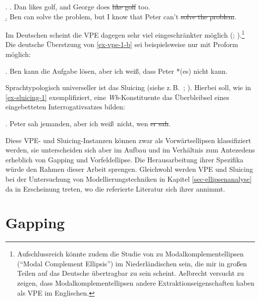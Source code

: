 \ex. \label{ex-vpe-1}
\a. Dan likes golf, and George does \sout{like golf} too. \\ \citep[(1)]{Dalrymple:etal:91}\label{ex-vpe-1-a}
\b. Ben can solve the problem, but I know that Peter can't \sout{solve the problem}. \hfill \citep[(32a), 134]{Winkler:05}\label{ex-vpe-1-b}

Im Deutschen scheint die VPE dagegen sehr viel eingeschränkter möglich (\citealt[158ff]{Lobeck:95}; \citealt[Kapitel~3]{Winkler:05}).\footnote{Aufschlussreich könnte zudem die Studie von \citet[Kapitel~2]{Aelbrecht:10} zu Modalkomplementellipsen ("`Modal Complement Ellipsis"') im Niederländischen sein, die mir in gro\ss en Teilen auf das Deutsche übertragbar zu sein scheint. Aelbrecht versucht zu zeigen, dass Modalkomplementellipsen andere Extraktionseigenschaften haben als VPE im Englischen.} Die deutsche Überstzung von \ref{ex-vpe-1-b} sei beispielsweise nur mit Proform möglich: 

\ex. Ben kann die Aufgabe lösen, aber ich weiß, dass Peter *(es) nicht kann. \hfill \citep[(33a), 134]{Winkler:05}\label{ex-vpe-2}

Sprachtypologisch universeller ist das Sluicing (siehe z.\,B.\  \citealt{Ross:69}; \citealt{Merchant:01}). Hierbei soll, wie in \ref{ex-sluicing-1} exemplifiziert, eine \textit{Wh}-Konstituente das Überbleibsel eines eingebetteten Interrogativsatzes bilden: 
 
\ex. \label{ex-sluicing-1}Peter sah jemanden, aber ich wei\ss\ nicht, wen \sout{er sah}.

Diese VPE- und Sluicing-Instanzen können zwar als Vorwärtsellipsen klassifiziert werden, sie unterscheiden sich aber im Aufbau und im Verhältnis zum Antezedens erheblich von Gapping und Vorfeldellipse. Die Herausarbeitung ihrer Spezifika würde den Rahmen dieser Arbeit sprengen. Gleichwohl werden VPE und Sluicing bei der Untersuchung von Modellierungstechniken in Kapitel \ref{sec-ellipsenanalyse} da in Erscheinung treten, wo die referierte Literatur sich ihrer annimmt.


\section{Gapping}\label{sec-gapping}

